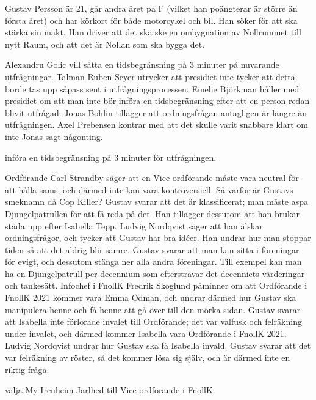 \documentclass[hidelinks]{sektionsmote} %
\begin{document}
Gustav Persson är 21, går andra året på F (vilket han poängterar är större än första året) och har körkort för både motorcykel och bil.
Han söker för att ska stärka sin makt.
Han driver att det ska ske en ombygnation av Nollrummet till nytt Raum, och att det är Nollan som ska bygga det.
\begin{ofraga}
  Alexandru Golic vill sätta en tidsbegränsning på 3 minuter på nuvarande utfrågningar.
  Talman Ruben Seyer utrycker att presidiet inte tycker att detta borde tas upp såpass sent i utfrågningsprocessen.
  Emelie Björkman håller med presidiet om att man inte bör införa en tidsbegränsning efter att en person redan blivit utfrågad.
  Jonas Bohlin tillägger att ordningsfrågan antagligen är längre än utfrågningen.
  Axel Prebensen kontrar med att det skulle varit snabbare klart om inte Jonas sagt någonting.
  \begin{beslut}
    \item införa en tidsbegränsning på 3 minuter för utfrågningen.
  \end{beslut}
\end{ofraga}
Ordförande Carl Strandby säger att en Vice ordförande måste vara neutral för att hålla sams, och därmed inte kan vara kontroversiell.
Så varför är Gustavs smeknamn då Cop Killer?
Gustav svarar att det är klassificerat; man måste aspa Djungelpatrullen för att få reda på det.
Han tillägger dessutom att han brukar städa upp efter Isabella Tepp.
Ludvig Nordqvist säger att han älskar ordningsfrågor, och tycker att Gustav har bra idéer.
Han undrar hur man stoppar tiden så att det aldrig blir sämre.
Gustav svarar att man kan sitta i föreningar för evigt, och dessutom stänga ner alla andra föreningar.
Till exempel kan man ha en Djungelpatrull per decennium som eftersträvar det decenniets värderingar och tankesätt.
Infochef i FnollK Fredrik Skoglund påminner om att Ordförande i FnollK 2021 kommer vara Emma Ödman, och undrar därmed hur Gustav ska manipulera henne och få henne att gå över till den mörka sidan.
Gustav svarar att Isabella inte förlorade invalet till Ordförande; det var valfusk och felräkning under invalet, och därmed kommer Isabella vara Ordförande i FnollK 2021.
Ludvig Nordqvist undrar hur Gustav ska få Isabella invald.
Gustav svarar att det var felräkning av röster, så det kommer lösa sig själv, och är därmed inte en riktig fråga.

\begin{beslut}
  \item välja My Irenheim Jarlhed till Vice ordförande i FnollK.
\end{beslut}
\end{document}
